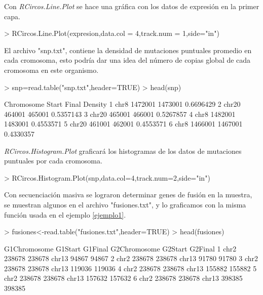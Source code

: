 \documentclass[a4paper,spanish]{article}
\begin{document}
Con \textit{RCircos.Line.Plot} se hace una gráfica con los datos de expresión en la primer capa.

\begin{Schunk}
\begin{Sinput}
> RCircos.Line.Plot(expresion,data.col = 4,track.num = 1,side="in")
\end{Sinput}
\end{Schunk}

El archivo "snp.txt", contiene la densidad de mutaciones puntuales promedio en cada cromosoma, esto podría dar una idea del número de copias global de cada cromosoma en este organismo. 

\begin{Schunk}
\begin{Sinput}
> snp=read.table("snp.txt",header=TRUE)
> head(snp)
\end{Sinput}
\begin{Soutput}
  Chromosome   Start   Final   Density
1       chr8 1472001 1473001 0.6696429
2      chr20  464001  465001 0.5357143
3      chr20  465001  466001 0.5267857
4       chr8 1482001 1483001 0.4553571
5      chr20  461001  462001 0.4553571
6       chr8 1466001 1467001 0.4330357
\end{Soutput}
\end{Schunk}

\textit{RCircos.Histogram.Plot} graficará los histogramas de los datos de mutaciones puntuales por cada cromosoma.

\begin{Schunk}
\begin{Sinput}
> RCircos.Histogram.Plot(snp,data.col=4,track.num=2,side="in")
\end{Sinput}
\end{Schunk}

Con secuenciación masiva se lograron determinar genes de fusión en la muestra, se muestran algunos en el archivo "fusiones.txt", y lo graficamos con la misma función usada en el ejemplo \ref{ejemplo1}.

\begin{Schunk}
\begin{Sinput}
> fusiones<-read.table("fusiones.txt",header=TRUE)
> head(fusiones)
\end{Sinput}
\begin{Soutput}
  G1Chromosome G1Start G1Final G2Chromosome G2Start G2Final
1         chr2  238678  238678        chr13   94867   94867
2         chr2  238678  238678        chr13   91780   91780
3         chr2  238678  238678        chr13  119036  119036
4         chr2  238678  238678        chr13  155882  155882
5         chr2  238678  238678        chr13  157632  157632
6         chr2  238678  238678        chr13  398385  398385
\end{Soutput}
\end{Schunk}
\end{document}
